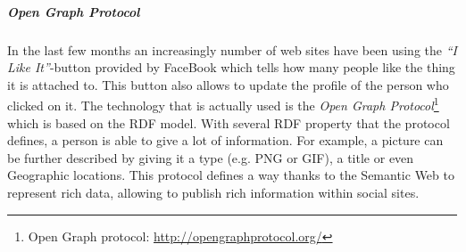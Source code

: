 % 

\subparagraph{Open Graph Protocol}

In the last few months an increasingly number of web sites have been using
the \emph{``I Like It''}-button provided by FaceBook which tells how many people
like the thing it is attached to. This button also allows to update the
profile of the person who clicked on it. The technology that is actually used is
the \emph{Open Graph Protocol}\footnote{Open
Graph protocol: \url{http://opengraphprotocol.org/}} which is based on the RDF
model. With several RDF property that the protocol defines, a person is able
to give a lot of information. For example, a picture can be further described
by giving it a type (e.g. PNG or GIF), a title or even Geographic locations.
This protocol defines a way thanks to the Semantic Web to represent rich
data, allowing to publish rich information within social sites.

